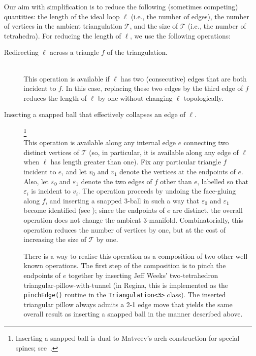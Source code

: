 \documentclass[a4paper,UKenglish,cleveref, autoref, thm-restate]{lipics-v2021}
\newcommand{\tri}{\mathcal{T}}
\begin{document}
Our aim with simplification is to reduce the following (sometimes competing) quantities:
the length of the ideal loop $\ell$ (i.e., the number of edges), the number of vertices in the ambient triangulation $\tri$, and the size of $\tri$ (i.e., the number of tetrahedra).
For reducing the length of $\ell$, we use the following operations:
\begin{description}
\item[Redirecting $\ell$ across a triangle $f$ of the triangulation.]
\hfill\\
This operation is available if $\ell$ has two (consecutive) edges that are both incident to $f$.
In this case, replacing these two edges by the third edge of $f$ reduces the length of $\ell$ by one without changing $\ell$ topologically.
\item[Inserting a snapped ball that effectively collapses an edge of $\ell$.]%
\hspace{-3pt}\footnote{Inserting a snapped ball is dual to Matveev's arch construction for special spines;
see~\cite[Section 1.1.4]{matveev2007algorithmic}.}%
\hfill\\
This operation is available along any internal edge $e$ connecting two distinct vertices of $\tri$
(so, in particular, it is available along any edge of $\ell$ when $\ell$ has length greater than one).
Fix any particular triangle $f$ incident to $e$, and let $v_0$ and $v_1$ denote the vertices at the endpoints of $e$.
Also, let $\varepsilon_0$ and $\varepsilon_1$ denote the two edges of $f$ other than $e$, labelled so that $\varepsilon_i$ is incident to $v_i$.
The operation proceeds by undoing the face-gluing along $f$, and inserting a snapped $3$-ball in such a way that $\varepsilon_0$ and $\varepsilon_1$ become identified
(see );
since the endpoints of $e$ are distinct, the overall operation does not change the ambient $3$-manifold.
Combinatorially, this operation reduces the number of vertices by one, but at the cost of increasing the size of $\tri$ by one.

There is a way to realise this operation as a composition of two other well-known operations.
The first step of the composition is to pinch the endpoints of $e$ together by inserting Jeff Weeks' two-tetrahedron triangular-pillow-with-tunnel
(in Regina, this is implemented as the \texttt{pinchEdge()} routine in the \texttt{Triangulation<3>} class).
The inserted triangular pillow always admits a 2-1 edge move that yields the same overall result as inserting a snapped ball in the manner described above.
\end{description}
\end{document}
